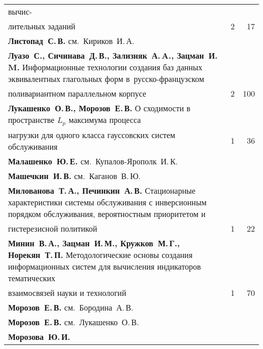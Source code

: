 {\begin{tabular}{p{388pt}rr}
вы\-чис-\linebreak
\vspace*{-12pt}\\
\hspace*{23pt}ли\-тель\-ных заданий\dotfill&2&17\\
\textbf{Листопад~С.\,В.} см.~Кириков~И.\,А.&&\\
\hangindent=23pt\noindent\textbf{Луазо~С., Сичинава~Д.\,В., Зализняк~А.\,A., Зацман~И.\,M.}
Информационные технологии создания баз данных эквивалентных глагольных форм
в~русско-французском\linebreak
\vspace*{-12pt}\\
\hspace*{23pt}поливариантном параллельном корпусе\dotfill&2&100\\
\textbf{Лукашенко~О.\,В., Морозов~Е.\,В.}
О сходимости в пространстве $L_p$ максимума процесса\linebreak
\vspace*{-12pt}\\
\hspace*{23pt}нагрузки для одного класса гауссовских систем обслуживания\dotfill&1&36\\
\textbf{Малашенко~Ю.\,Е.} см.~Купалов-Ярополк~И.\,К.&&\\
\textbf{Машечкин~И.\,В.} см.~Каганов~В.\,Ю.&&\\
\hangindent=23pt\noindent\textbf{Милованова~Т.\,А., Печинкин~А.\,В.}
Стационарные характеристики системы обслуживания с инверсионным порядком
обслуживания, вероятностным приоритетом и\linebreak
\vspace*{-12pt}\\
\hspace*{23pt}гистерезисной политикой\dotfill&1&22\\
\hangindent=23pt\noindent\textbf{Минин~В.\,А., Зацман~И.\,М., Кружков~М.\,Г., Норекян~Т.\,П.}
Методологические основы создания информационных систем для вычисления
индикаторов тематических\linebreak
\vspace*{-12pt}\\
\hspace*{23pt}взаимосвязей науки и технологий\dotfill&1&70\\
\textbf{Морозов~Е.\,В.} см.~Бородина~А.\,В.&&\\
\textbf{Морозов~Е.\,В.} см.~Лукашенко~О.\,В.&&\\
\textbf{Морозова~Ю.\,И.}

\end{tabular}}
